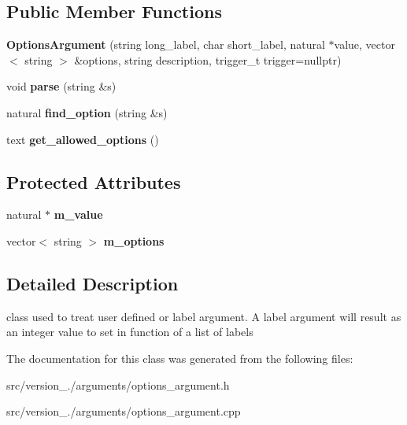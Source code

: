 \subsection*{Public Member Functions}
\begin{DoxyCompactItemize}
\item 
\mbox{\label{classez_1_1arguments_1_1OptionsArgument_aca22e31728417f749f8eda0b6b0de53a}} 
{\bfseries Options\+Argument} (string long\+\_\+label, char short\+\_\+label, natural $\ast$value, vector$<$ string $>$ \&options, string description, trigger\+\_\+t trigger=nullptr)
\item 
\mbox{\label{classez_1_1arguments_1_1OptionsArgument_a94910ed7bd20f7342ee31559786caab0}} 
void {\bfseries parse} (string \&s)
\item 
\mbox{\label{classez_1_1arguments_1_1OptionsArgument_aa63cfeb0baaa0b498e962ddb38aebe9f}} 
natural {\bfseries find\+\_\+option} (string \&s)
\item 
\mbox{\label{classez_1_1arguments_1_1OptionsArgument_aa65594cce268a8ef3386b143b5f31bb0}} 
text {\bfseries get\+\_\+allowed\+\_\+options} ()
\end{DoxyCompactItemize}
\subsection*{Protected Attributes}
\begin{DoxyCompactItemize}
\item 
\mbox{\label{classez_1_1arguments_1_1OptionsArgument_a75775703e338ad7580ce63c662367b41}} 
natural $\ast$ {\bfseries m\+\_\+value}
\item 
\mbox{\label{classez_1_1arguments_1_1OptionsArgument_a73db71b653d948643edc643432c50614}} 
vector$<$ string $>$ {\bfseries m\+\_\+options}
\end{DoxyCompactItemize}


\subsection{Detailed Description}
class used to treat user defined or label argument. A label argument will result as an integer value to set in function of a list of labels 

The documentation for this class was generated from the following files\+:\begin{DoxyCompactItemize}
\item 
src/version\+\_./arguments/options\+\_\+argument.\+h\item 
src/version\+\_./arguments/options\+\_\+argument.\+cpp\end{DoxyCompactItemize}
